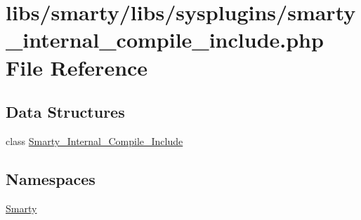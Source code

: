 \hypertarget{smarty__internal__compile__include_8php}{}\section{libs/smarty/libs/sysplugins/smarty\+\_\+internal\+\_\+compile\+\_\+include.php File Reference}
\label{smarty__internal__compile__include_8php}
\subsection*{Data Structures}
\begin{DoxyCompactItemize}
\item 
class \hyperlink{class_smarty___internal___compile___include}{Smarty\+\_\+\+Internal\+\_\+\+Compile\+\_\+\+Include}
\end{DoxyCompactItemize}
\subsection*{Namespaces}
\begin{DoxyCompactItemize}
\item 
 \hyperlink{namespace_smarty}{Smarty}
\end{DoxyCompactItemize}
